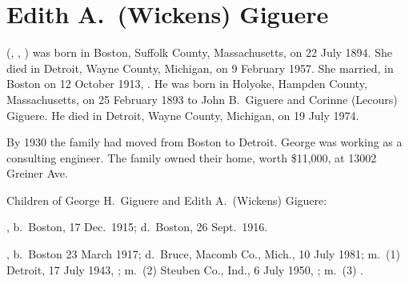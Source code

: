 \section{Edith A.\ (Wickens) Giguere}\label{per:Edith4Wickens}

 (, , ) was born in Boston, Suffolk County, Massachusetts, on 22 July 1894.\cite{Edith4WickensBirth} She died in Detroit, Wayne County, Michigan, on 9 February 1957.\cite{Edith4WickensDeath} She married, in Boston on 12 October 1913, .\cite{Edith4WickensMarriage} He was born in Holyoke, Hampden County, Massachusetts, on 25 February 1893 to John B.\ Giguere and Corinne (Lecours) Giguere.\cite{GeorgeGiguereBirth} He died in Detroit, Wayne County, Michigan, on 19 July 1974.\cite{GeorgeGiguereDeath}

By 1930 the family had moved from Boston to Detroit. George was working as a consulting engineer. The family owned their home, worth \$11,000, at 13002 Greiner Ave.\cite{Census1930GeorgeGiguere}

\begin{KidsIntro}
	Children of George H.\ Giguere and Edith A.\ (Wickens) Giguere:
\end{KidsIntro}

\begin{Kids}
	, b.\ Boston, 17 Dec.\ 1915;\cite{Robert5GiguereDeath} d.\ Boston, 26 Sept.\ 1916.\cite{Robert5GiguereDeath}
	
	, b.\ Boston 23 March 1917;\cite{JohnMeyersMarriage,Dorris5GiguereSSDeath} d.\ Bruce, Macomb Co., Mich., 10 July 1981;\cite{Dorris5GiguereMichiganDeath} m.\ (1) Detroit, 17 July 1943, ;\cite{RobertMayMarriage} m.\ (2) Steuben Co., Ind., 6 July 1950, ;\cite{JohnMeyersMarriage} m.\ (3) .\cite{Dorris5GiguereObit}
\end{Kids}